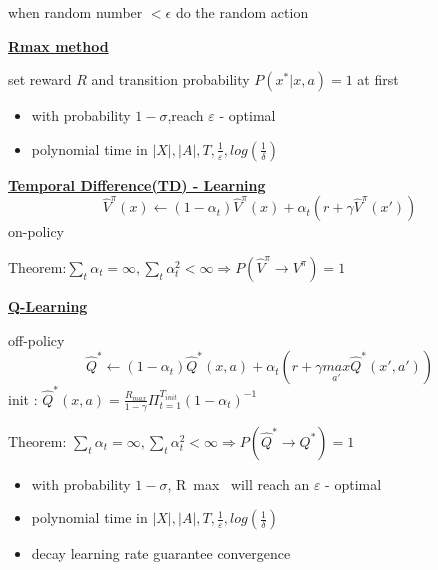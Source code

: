 \documentclass[landscape,a0paper,fontscale=0.285]{baposter} %
\newcommand{\compresslist}{ %
\setlength{\itemsep}{1pt}
\setlength{\parskip}{0pt}
\setlength{\parsep}{0pt}
}
\begin{document}
\begin{poster}
{when random number $<\epsilon$ do the random action 

\underline{\textbf{Rmax method}}

set reward $R$ and transition probability $P(x^*|x,a)=1$ at first
\begin{itemize}
    \item with probability $1-\sigma$,reach $\varepsilon$ - optimal
    \item polynomial time in $|X|, |A|, T,\frac{1}{\varepsilon},log(\frac{1}{\delta})$
\end{itemize}



\colorbox[HTML]{CCFFFF}{}


\underline{\textbf{Temporal Difference(TD) - Learning}}
\vspace{-0.2cm}
$$
\hat V^\pi (x)\leftarrow (1-\alpha_t)\hat V^\pi (x) + \alpha_t(r+\gamma\hat V^\pi (x'))
$$
on-policy 

Theorem:$
\sum_t\alpha_t=\infty,\sum_t\alpha_t^2 < \infty \Rightarrow P(\hat V^\pi\rightarrow  V^\pi) = 1
$

\underline{\textbf{Q-Learning}}


off-policy\vspace{-0.2cm}
$$
\hat Q^* \leftarrow (1-\alpha_t)\hat Q^*(x,a) + \alpha_t(r+\gamma \underset{a'}{max}\hat Q^*(x',a'))
$$
init : $\hat Q^*(x,a) = \frac{R_{max}}{1-\gamma}\Pi_{t=1}^{T_{init}}(1-\alpha_t)^{-1}$

Theorem: $\sum_t\alpha_t=\infty,\sum_t\alpha_t^2 < \infty \Rightarrow P(\hat Q^*\rightarrow  Q^*) = 1$  
\begin{itemize}\compresslist
    \item with probability $1-\sigma$,  R~max~ will reach an $\varepsilon$ - optimal
    \item polynomial time in $|X|, |A|, T,\frac{1}{\varepsilon},log(\frac{1}{\delta})$
    \item decay learning rate guarantee convergence
\end{itemize}
}

\end{poster}
\end{document}
